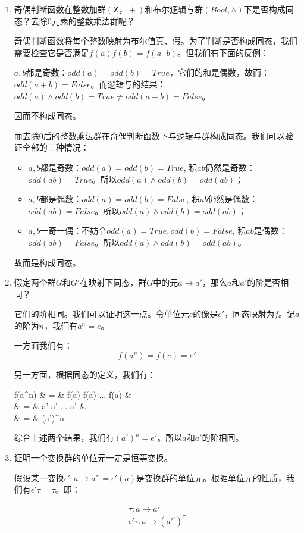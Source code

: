 \documentclass[UTF8]{article}
\begin{document}
\begin{enumerate}
\item 奇偶判断函数在整数加群$(\pmb{Z}，+)$和布尔逻辑与群$(Bool, \land)$下是否构成同态？去除0元素的整数乘法群呢？

奇偶判断函数将每个整数映射为布尔值真、假。为了判断是否构成同态，我们需要检查它是否满足$f(a) f (b) = f(a \cdot b)$。但我们有下面的反例：

$a, b$都是奇数：$odd(a) = odd(b) = True$，它们的和是偶数，故而：$odd(a + b) = False$。而逻辑与的结果：$odd(a) \land odd(b) = True \neq odd(a + b) = False$。

因而不构成同态。

而去除0后的整数乘法群在奇偶判断函数下与逻辑与群构成同态。我们可以验证全部的三种情况：

  \begin{itemize}
  \item $a, b$都是奇数：$odd(a) = odd(b) = True$, 积$ab$仍然是奇数：$odd(ab) = True$。所以$odd(a) \land odd(b) = odd(ab)$；
  \item $a, b$都是偶数：$odd(a) = odd(b) = False$, 积$ab$仍然是偶数：$odd(ab) = False$。所以$odd(a) \land odd(b) = odd(ab)$；
  \item $a, b$一奇一偶：不妨令$odd(a) = True, odd(b) = False$, 积$ab$是偶数：$odd(ab) = False$。所以$odd(a) \land odd(b) = odd(ab)$。
  \end{itemize}

故而是构成同态。

\item 假定两个群$G$和$G'$在映射下同态，群$G$中的元$a \to a'$，那么$a$和$a'$的阶是否相同？

它们的阶相同。我们可以证明这一点。令单位元$e$的像是$e'$，同态映射为$f$。记$a$的阶为$n$，我们有$a^n = e$。

一方面我们有：
\[
f(a^n) = f(e) = e'
\]

另一方面，根据同态的定义，我们有：

\bre
f(a^n) & = & f(a) f(a) ... f(a) &  \\
  & = & a' a' ... a' &  \\
  & = & (a')^n
\ere

综合上述两个结果，我们有$(a')^n = e'$。所以$a$和$a'$的阶相同。

\item 证明一个变换群的单位元一定是恒等变换。

假设某一变换$\epsilon': a \to a^{\epsilon'} = \epsilon'(a)$是变换群的单位元。根据单位元的性质，我们有$\epsilon' \tau = \tau$。即：

\[
\begin{array}{l}
\tau: a \to a^\tau \\
\epsilon' \tau: a \to (a^{\epsilon'})^\tau \\
\end{array}
\]


\end{enumerate}
\end{document}
